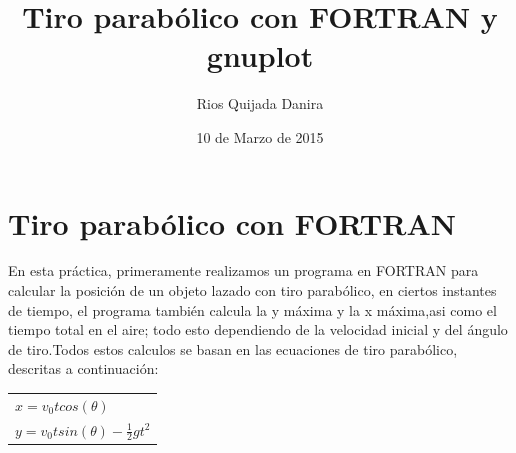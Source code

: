 \documentclass[10pt]{article}
\title{Tiro parabólico con FORTRAN y gnuplot}
\author{Rios Quijada Danira}
\date{10 de Marzo de 2015}
\begin{document}
\maketitle
\section{Tiro parabólico con FORTRAN}
En esta práctica, primeramente realizamos un programa en FORTRAN para calcular la posición de un objeto lazado con tiro parabólico, en ciertos instantes de tiempo, el programa también calcula la y máxima y la x máxima,asi como el tiempo total en el aire; todo esto dependiendo de la velocidad inicial y del ángulo de tiro.Todos estos calculos se basan en las ecuaciones de tiro parabólico, descritas a continuación:
\space
\space  
\begin{tabular}{l}
$x=v_{0}tcos(\theta)$\\
$y=v_{0}tsin(\theta)- \frac{1}{2}gt^2$

\end{tabular}
\end{document}
